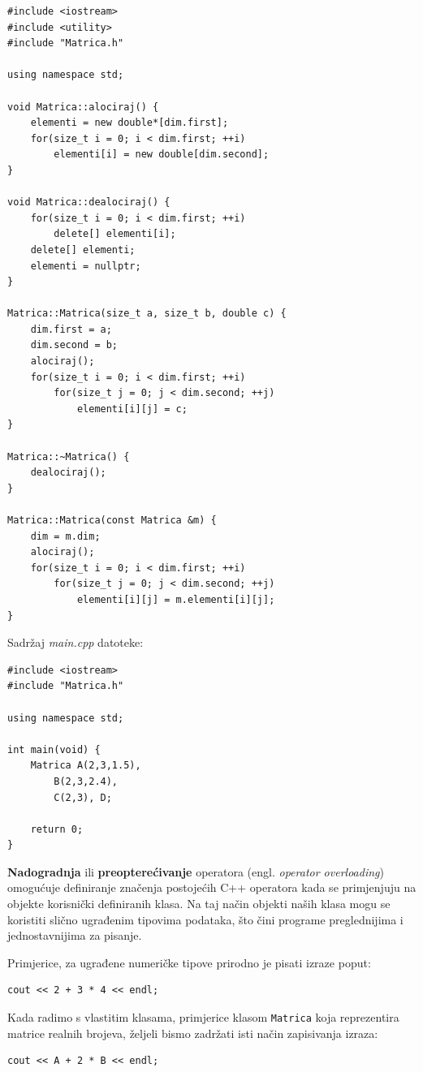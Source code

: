 \begin{verbatim}
#include <iostream>
#include <utility>
#include "Matrica.h"

using namespace std;

void Matrica::alociraj() {
	elementi = new double*[dim.first];
	for(size_t i = 0; i < dim.first; ++i)
		elementi[i] = new double[dim.second];
}

void Matrica::dealociraj() {
	for(size_t i = 0; i < dim.first; ++i)
		delete[] elementi[i];
	delete[] elementi;
	elementi = nullptr;
}

Matrica::Matrica(size_t a, size_t b, double c) {
	dim.first = a;
	dim.second = b;
	alociraj();
	for(size_t i = 0; i < dim.first; ++i)
		for(size_t j = 0; j < dim.second; ++j)
			elementi[i][j] = c;
}

Matrica::~Matrica() {
	dealociraj();
}

Matrica::Matrica(const Matrica &m) {
	dim = m.dim;
	alociraj();
	for(size_t i = 0; i < dim.first; ++i)
		for(size_t j = 0; j < dim.second; ++j)
			elementi[i][j] = m.elementi[i][j];
}
\end{verbatim}

Sadržaj \textit{main.cpp} datoteke:

\begin{verbatim}
#include <iostream>
#include "Matrica.h"

using namespace std;

int main(void) {
	Matrica A(2,3,1.5), 
		B(2,3,2.4),
		C(2,3), D;
	
	return 0;
}
\end{verbatim}


\textbf{Nadogradnja} ili \textbf{preopterećivanje} operatora (engl. \textit{operator overloading}) 
omogućuje definiranje značenja postojećih C++ operatora kada se primjenjuju na objekte korisnički definiranih klasa. 
Na taj način objekti naših klasa mogu se koristiti slično ugrađenim tipovima podataka, što čini programe preglednijima i jednostavnijima za pisanje.
\medskip

Primjerice, za ugrađene numeričke tipove prirodno je pisati izraze poput:
\begin{verbatim}
cout << 2 + 3 * 4 << endl;
\end{verbatim}

Kada radimo s vlastitim klasama, primjerice klasom \texttt{Matrica}
koja reprezentira matrice realnih brojeva, željeli bismo zadržati isti način zapisivanja izraza:
\begin{verbatim}
cout << A + 2 * B << endl;
\end{verbatim}

